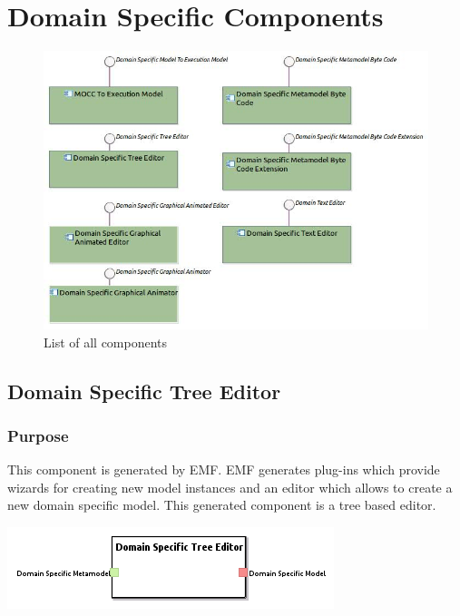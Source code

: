 \documentclass{gemoc} %
\begin{document}
\section{Domain Specific Components}
\begin{figure}[bt]
	\begin{center}
	\includegraphics*[trim=0.0cm 0.0cm 0cm 0.0cm, clip=true, width=1.0\linewidth]{../images/DomainSpecificComponents.jpg}
	\caption{List of all components}
	\label{fig:DomainSpecificComponentList}
	\end{center}
\end{figure}
\subsection{Domain Specific Tree Editor}


\subsubsection{Purpose}
This component is generated by EMF. EMF generates plug-ins which provide wizards for creating new model instances and an editor which allows to create a new domain specific model. This generated component is a tree based editor.
\begin{center}
\includegraphics*[trim=0.0cm 0.0cm 0cm 0.0cm, clip=true]{../images/generated/Generated_Domain_Specific_Tree_Editor.png}
\end{center}
\end{document}
